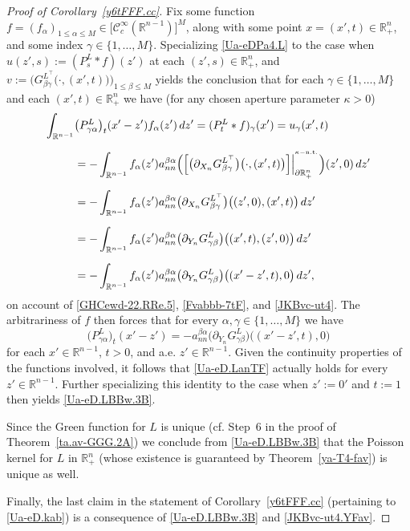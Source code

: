 \documentclass[11pt,reqno]{amsart}
\numberwithin{equation}{section}
\theoremstyle{remark}
\begin{document}
\vskip 0.08in
\begin{proof}[Proof of Corollary~\ref{y6tFFF.cc}]
Fix some function $f=(f_\alpha)_{1\leq\alpha\leq M}\in\big[{\mathscr{C}}^\infty_c({\mathbb{R}}^{n-1})\big]^M$, 
along with some point $x=(x',t)\in{\mathbb{R}}^n_{+}$, and some index $\gamma\in\{1,\dots,M\}$. 
Specializing \eqref{Ua-eDPa4.L} to the case when $u(z',s):=(P^L_s\ast f)(z')$ at each 
$(z',s)\in{\mathbb{R}}^n_{+}$, and $v:=\big(G^{L^\top}_{\beta\gamma}\big(\cdot,(x',t)\big)\big)_{1\leq\beta\leq M}$ 
yields the conclusion that for each $\gamma\in\{1,\dots,M\}$ and each 
$(x',t)\in{\mathbb{R}}^n_{+}$ we have (for any chosen aperture parameter $\kappa>0$) 
%
\begin{align}\label{Ua-eDPa4.LBBw}
\int_{\mathbb{R}^{n-1}} & \big(P^L_{\gamma\alpha}\big)_t(x'-z')f_\alpha(z')\,dz'
=(P^L_t\ast f)_\gamma(x')=u_\gamma(x',t)
\nonumber\\[6pt]
&=-\int_{\mathbb{R}^{n-1}}f_\alpha(z')a^{\beta\alpha}_{nn}
\Big(\Big[\big(\partial_{X_n} G^{L^\top}_{\beta\gamma}\big)\big(\cdot,(x',t)\big)\Big]
\Big|_{\partial\mathbb{R}^{n}_{+}}^{{}^{\kappa-{\rm n.t.}}}\Big)(z',0)\,dz'
\nonumber\\[6pt]
&=-\int_{\mathbb{R}^{n-1}}f_\alpha(z')a^{\beta\alpha}_{nn}
\big(\partial_{X_n} G^{L^\top}_{\beta\gamma}\big)\big((z',0),(x',t)\big)\,dz'
\nonumber\\[6pt]
&=-\int_{\mathbb{R}^{n-1}}f_\alpha(z')a^{\beta\alpha}_{nn}
\big(\partial_{Y_n} G^{L}_{\gamma\beta}\big)\big((x',t),(z',0)\big)\,dz'
\nonumber\\[6pt]
&=-\int_{\mathbb{R}^{n-1}}f_\alpha(z')a^{\beta\alpha}_{nn}
\big(\partial_{Y_n} G^{L}_{\gamma\beta}\big)\big((x'-z',t),0\big)\,dz',
\end{align}
%
on account of \eqref{GHCewd-22.RRe.5}, \eqref{Fvabbb-7tF}, and \eqref{JKBvc-ut4}.
The arbitrariness of $f$ then forces that for every $\alpha,\gamma\in\{1,\dots,M\}$ we have
%
\begin{equation}\label{Ua-eD.LanTF}
\big(P^L_{\gamma\alpha}\big)_t(x'-z')=-a^{\beta\alpha}_{nn}
\big(\partial_{Y_n} G^{L}_{\gamma\beta}\big)\big((x'-z',t),0\big)
\end{equation}
%
for each $x'\in{\mathbb{R}}^{n-1}$, $t>0$, and a.e. $z'\in{\mathbb{R}}^{n-1}$.
Given the continuity properties of the functions involved, it follows that \eqref{Ua-eD.LanTF} actually 
holds for every $z'\in{\mathbb{R}}^{n-1}$. Further specializing this identity to the case when $z':=0'$ 
and $t:=1$ then yields \eqref{Ua-eD.LBBw.3B}. 

Since the Green function for $L$ is unique (cf. Step~6 in the proof of Theorem~\ref{ta.av-GGG.2A}) 
we conclude from \eqref{Ua-eD.LBBw.3B} that the Poisson kernel for $L$ in ${\mathbb{R}}^n_{+}$ 
(whose existence is guaranteed by Theorem~\ref{ya-T4-fav}) is unique as well. 

Finally, the last claim in the statement of Corollary~\ref{y6tFFF.cc} (pertaining to \eqref{Ua-eD.kab}) 
is a consequence of \eqref{Ua-eD.LBBw.3B} and \eqref{JKBvc-ut4.YFav}.
\end{proof}
\end{document}
